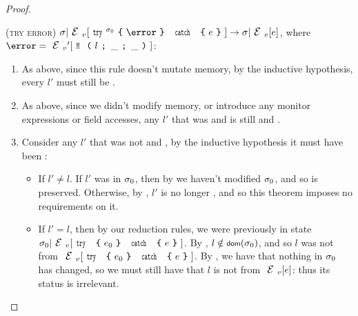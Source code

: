 \begin{proof}
\begin{ienumerate}
\item (\textsc{try error}) $\s|\EV[\trys{\s_0}{\error}{e}] \rightarrow \s|\EV[e]$, where $\error = \EV'[\M{l}{\_}{\_}]$:
\begin{enumerate}
	\item As above, since this rule doesn't mutate memory, by the inductive hypothesis, every $l'$ must still be \RNC.
	\item As above, since we didn't modify memory, or introduce any monitor expressions or field accesses, any $l'$ that was \ENR and \NRM is still \ENR and \NRM.
	\item Consider any $l'$ that was not \ENR and \NRM, by the inductive hypothesis it must have been \HNO:
	\begin{itemize}
		\item If $l' \neq l$. If $l'$ was in $\sigma_0$, then by  we haven't modified $\sigma_0$, and so \HNO is preserved. Otherwise, by , $l'$ is no longer \reach, and so this theorem imposes no requirements on it.
		\item If $l' = l$, then by our reduction rules, we were previously in state $\s_0|\EV[\try{e_0}{e}]$. By , $l \notin \dom(\s_0)$, and so $l$ was not \reach from $\EV[\try{e_0}{e}]$. By , we have that nothing in $\sigma_0$  has changed, so we must still have that $l$ is not \reach from $\EV[e]$: thus its status is irrelevant.
	\end{itemize}
\end{enumerate}


\end{ienumerate}
\end{proof}

